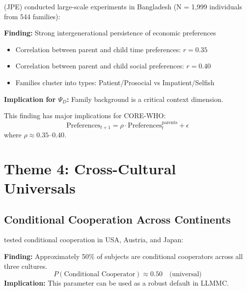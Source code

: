 \citet{chowdhury2022preferences} (JPE) conducted large-scale experiments in Bangladesh (N = 1,999 individuals from 544 families):

\begin{tcolorbox}[colback=green!5!white, colframe=green!75!black,
    title=Key Result UNMAPPED_SU-4: Preference Heritability]
\textbf{Finding:} Strong intergenerational persistence of economic preferences
\begin{itemize}[nosep]
\item Correlation between parent and child time preferences: $r = 0.35$
\item Correlation between parent and child social preferences: $r = 0.40$
\item Families cluster into types: Patient/Prosocial vs Impatient/Selfish
\end{itemize}
\textbf{Implication for $\Psi_D$:} Family background is a critical context dimension.
\end{tcolorbox}

This finding has major implications for CORE-WHO:
\begin{equation}
\text{Preferences}_{t+1} = \rho \cdot \text{Preferences}_t^{\text{parents}} + \epsilon
\end{equation}
where $\rho \approx 0.35$--$0.40$.


\section{Theme 4: Cross-Cultural Universals}
\label{sec:su-crosscultural}

\subsection{Conditional Cooperation Across Continents}

\citet{kocher2008conditional} tested conditional cooperation in USA, Austria, and Japan:

\begin{tcolorbox}[colback=green!5!white, colframe=green!75!black,
    title=Key Result UNMAPPED_SU-5: Universal Conditional Cooperation]
\textbf{Finding:} Approximately 50\% of subjects are conditional cooperators across all three cultures.
\begin{equation}
P(\text{Conditional Cooperator}) \approx 0.50 \quad \text{(universal)}
\end{equation}
\textbf{Implication:} This parameter can be used as a robust default in LLMMC.
\end{tcolorbox}

